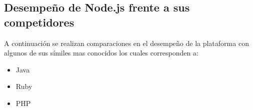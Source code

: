 %
%
%
%
%
%
%
%


\subsection{Desempeño de Node.js frente a sus competidores}
	A continuación se realizan comparaciones en el desempeño de la plataforma  con algunos de sus símiles mas conocidos los cuales corresponden a:
	
	\begin{itemize}
		\item Java
		\item Ruby
		\item PHP
	\end{itemize}

